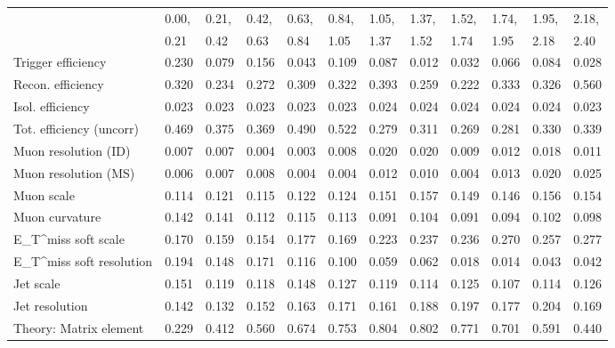 \begin{tabular}{l|p{0.6cm}p{0.6cm}p{0.6cm}p{0.6cm}p{0.6cm}p{0.6cm}p{0.6cm}p{0.6cm}p{0.6cm}p{0.6cm}p{0.6cm}}
\hline
   & 0.00, & 0.21, & 0.42, & 0.63, & 0.84, & 1.05, & 1.37, & 1.52, & 1.74, & 1.95, & 2.18,  \\ 
   & 0.21 & 0.42 & 0.63 & 0.84 & 1.05 & 1.37 & 1.52 & 1.74 & 1.95 & 2.18 & 2.40  \\ 
\hline
Trigger efficiency                       & 0.230 & 0.079 & 0.156 & 0.043 & 0.109 & 0.087 & 0.012 & 0.032 & 0.066 & 0.084 & 0.028 \\
Recon. efficiency                        & 0.320 & 0.234 & 0.272 & 0.309 & 0.322 & 0.393 & 0.259 & 0.222 & 0.333 & 0.326 & 0.560 \\
Isol. efficiency                         & 0.023 & 0.023 & 0.023 & 0.023 & 0.023 & 0.024 & 0.024 & 0.024 & 0.024 & 0.024 & 0.023 \\
Tot. efficiency (uncorr)                 & 0.469 & 0.375 & 0.369 & 0.490 & 0.522 & 0.279 & 0.311 & 0.269 & 0.281 & 0.330 & 0.339 \\
Muon resolution (ID)                     & 0.007 & 0.007 & 0.004 & 0.003 & 0.008 & 0.020 & 0.020 & 0.009 & 0.012 & 0.018 & 0.011 \\
Muon resolution (MS)                     & 0.006 & 0.007 & 0.008 & 0.004 & 0.004 & 0.012 & 0.010 & 0.004 & 0.013 & 0.020 & 0.025 \\
Muon scale                               & 0.114 & 0.121 & 0.115 & 0.122 & 0.124 & 0.151 & 0.157 & 0.149 & 0.146 & 0.156 & 0.154 \\
Muon curvature                           & 0.142 & 0.141 & 0.112 & 0.115 & 0.113 & 0.091 & 0.104 & 0.091 & 0.094 & 0.102 & 0.098 \\
E_{T}^{miss} soft scale                  & 0.170 & 0.159 & 0.154 & 0.177 & 0.169 & 0.223 & 0.237 & 0.236 & 0.270 & 0.257 & 0.277 \\
E_{T}^{miss} soft resolution             & 0.194 & 0.148 & 0.171 & 0.116 & 0.100 & 0.059 & 0.062 & 0.018 & 0.014 & 0.043 & 0.042 \\
Jet scale                                & 0.151 & 0.119 & 0.118 & 0.148 & 0.127 & 0.119 & 0.114 & 0.125 & 0.107 & 0.114 & 0.126 \\
Jet resolution                           & 0.142 & 0.132 & 0.152 & 0.163 & 0.171 & 0.161 & 0.188 & 0.197 & 0.177 & 0.204 & 0.169 \\
Theory: Matrix element                   & 0.229 & 0.412 & 0.560 & 0.674 & 0.753 & 0.804 & 0.802 & 0.771 & 0.701 & 0.591 & 0.440 \\

\end{tabular}
